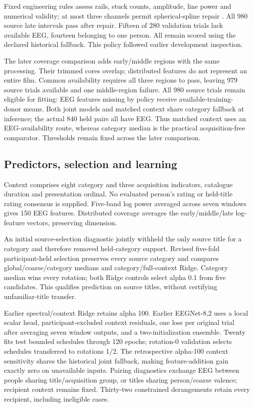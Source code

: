 \documentclass[12pt,a4paper]{article}
\begin{document}
Fixed engineering rules assess rails, stuck counts, amplitude, line power and numerical validity; at most three channels permit spherical-spline repair \cite{perrin1989spherical}. All 980 source late intervals pass after repair. Fifteen of 280 validation trials lack available EEG, fourteen belonging to one person. All remain scored using the declared historical fallback. This policy followed earlier development inspection.

The later coverage comparison adds early/middle regions with the same processing. Their trimmed cores overlap; distributed features do not represent an entire film. Common availability requires all three regions to pass, leaving 979 source trials available and one middle-region failure. All 980 source trials remain eligible for fitting: EEG features missing by policy receive available-training-donor means. Both joint models and matched context share category fallback at inference; the actual 840 held pairs all have EEG. Thus matched context uses an EEG-availability route, whereas category median is the practical acquisition-free comparator. Thresholds remain fixed across the later comparison.

\subsection{Predictors, selection and learning}
Context comprises eight category and three acquisition indicators, catalogue duration and presentation ordinal. No evaluated person's rating or held-title rating consensus is supplied. Five-band log power averaged across seven windows gives 150 EEG features. Distributed coverage averages the early/middle/late log-feature vectors, preserving dimension.

An initial source-selection diagnostic jointly withheld the only source title for a category and therefore removed held-category support. Revised five-fold participant-held selection preserves every source category and compares global/coarse/category medians and category/full-context Ridge. Category median wins every rotation; both Ridge controls select alpha 0.1 from five candidates. This qualifies prediction on source titles, without certifying unfamiliar-title transfer.

Earlier spectral/context Ridge retains alpha 100. Earlier EEGNet-8,2 uses a local scalar head, participant-excluded context residuals, one loss per original trial after averaging seven window outputs, and a two-initialization ensemble. Twenty fits test bounded schedules through 120 epochs; rotation-0 validation selects schedules transferred to rotations 1/2. The retrospective alpha-100 context sensitivity shares the historical joint fallback, making feature-addition gain exactly zero on unavailable inputs. Pairing diagnostics exchange EEG between people sharing title/acquisition group, or titles sharing person/coarse valence; recipient context remains fixed. Thirty-two constrained derangements retain every recipient, including ineligible cases.
\end{document}
